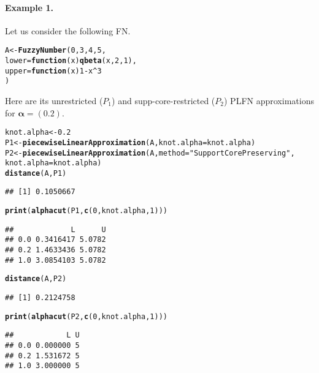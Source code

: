 \documentclass[11pt]{article}\usepackage[]{graphicx}\usepackage[]{color}
\makeatletter
\newcommand{\hlnum}[1]{\textcolor[rgb]{0.686,0.059,0.569}{#1}}%
\newcommand{\hlstr}[1]{\textcolor[rgb]{0.192,0.494,0.8}{#1}}%
\newcommand{\hlopt}[1]{\textcolor[rgb]{0,0,0}{#1}}%
\newcommand{\hlstd}[1]{\textcolor[rgb]{0.345,0.345,0.345}{#1}}%
\newcommand{\hlkwa}[1]{\textcolor[rgb]{0.161,0.373,0.58}{\textbf{#1}}}%
\newcommand{\hlkwb}[1]{\textcolor[rgb]{0.69,0.353,0.396}{#1}}%
\newcommand{\hlkwc}[1]{\textcolor[rgb]{0.333,0.667,0.333}{#1}}%
\newcommand{\hlkwd}[1]{\textcolor[rgb]{0.737,0.353,0.396}{\textbf{#1}}}%
\newenvironment{kframe}{%
 \def\at@end@of@kframe{}%
 \ifinner\ifhmode%
  \def\at@end@of@kframe{\end{minipage}}%
  \begin{minipage}{\columnwidth}%
 \fi\fi%
 \def\FrameCommand##1{\hskip\@totalleftmargin \hskip-\fboxsep
 \colorbox{shadecolor}{##1}\hskip-\fboxsep
     \hskip-\linewidth \hskip-\@totalleftmargin \hskip\columnwidth}%
 \MakeFramed {\advance\hsize-\width
   \@totalleftmargin\z@ \linewidth\hsize
   \@setminipage}}%
 {\par\unskip\endMakeFramed%
 \at@end@of@kframe}
\newenvironment{knitrout}{}{} %
\makeatother
\begin{document}
\paragraph{Example 1.}
Let us consider the following FN.

\begin{knitrout}\small
{}\color{fgcolor}\begin{kframe}
\begin{alltt}
\hlstd{A} \hlkwb{<-} \hlkwd{FuzzyNumber}\hlstd{(}\hlnum{0}\hlstd{,} \hlnum{3}\hlstd{,} \hlnum{4}\hlstd{,} \hlnum{5}\hlstd{,}
   \hlkwc{lower}\hlstd{=}\hlkwa{function}\hlstd{(}\hlkwc{x}\hlstd{)} \hlkwd{qbeta}\hlstd{(x,} \hlnum{2}\hlstd{,} \hlnum{1}\hlstd{),}
   \hlkwc{upper}\hlstd{=}\hlkwa{function}\hlstd{(}\hlkwc{x}\hlstd{)} \hlnum{1}\hlopt{-}\hlstd{x}\hlopt{^}\hlnum{3}
\hlstd{)}
\end{alltt}
\end{kframe}
\end{knitrout}

Here are its unrestricted ($P_1$) and supp-core-restricted ($P_2$)
PLFN approximations for $\boldsymbol\alpha=(0.2)$.

\begin{knitrout}\small
{}\color{fgcolor}\begin{kframe}
\begin{alltt}
\hlstd{knot.alpha} \hlkwb{<-} \hlnum{0.2}
\hlstd{P1} \hlkwb{<-} \hlkwd{piecewiseLinearApproximation}\hlstd{(A,} \hlkwc{knot.alpha}\hlstd{=knot.alpha)}
\hlstd{P2} \hlkwb{<-} \hlkwd{piecewiseLinearApproximation}\hlstd{(A,} \hlkwc{method}\hlstd{=}\hlstr{"SupportCorePreserving"}\hlstd{,}
   \hlkwc{knot.alpha}\hlstd{=knot.alpha)}
\hlkwd{distance}\hlstd{(A, P1)}
\end{alltt}
\begin{verbatim}
## [1] 0.1050667
\end{verbatim}
\begin{alltt}
\hlkwd{print}\hlstd{(}\hlkwd{alphacut}\hlstd{(P1,} \hlkwd{c}\hlstd{(}\hlnum{0}\hlstd{, knot.alpha,} \hlnum{1}\hlstd{)))}
\end{alltt}
\begin{verbatim}
##             L      U
## 0.0 0.3416417 5.0782
## 0.2 1.4633436 5.0782
## 1.0 3.0854103 5.0782
\end{verbatim}
\begin{alltt}
\hlkwd{distance}\hlstd{(A, P2)}
\end{alltt}
\begin{verbatim}
## [1] 0.2124758
\end{verbatim}
\begin{alltt}
\hlkwd{print}\hlstd{(}\hlkwd{alphacut}\hlstd{(P2,} \hlkwd{c}\hlstd{(}\hlnum{0}\hlstd{, knot.alpha,} \hlnum{1}\hlstd{)))}
\end{alltt}
\begin{verbatim}
##            L U
## 0.0 0.000000 5
## 0.2 1.531672 5
## 1.0 3.000000 5
\end{verbatim}
\end{kframe}
\end{knitrout}
\end{document}

